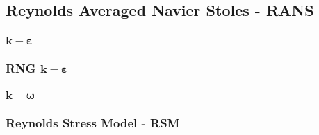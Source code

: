 
\subsection{Reynolds Averaged Navier Stoles - RANS}
	\subsubsection{$\mathbf{k - \varepsilon}$}
	\subsubsection{RNG $\mathbf{k - \varepsilon}$}
	\subsubsection{$\mathbf{k - \omega}$}
	\subsubsection{Reynolds Stress Model - RSM}